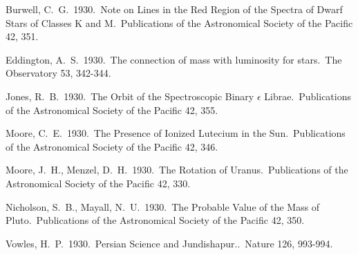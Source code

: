 \documentclass{lowell-prop}
\begin{document}


\begin{thebibliography}{99}
 Burwell, C.~G.\ 1930.\ Note on 
Lines in the Red Region of the Spectra of Dwarf Stars of Classes K and M.\ 
Publications of the Astronomical Society of the Pacific 42, 351. 

 Eddington, A.~S.\ 1930.\ The 
connection of mass with luminosity for stars.\ The Observatory 53, 342-344. 

 Jones, R.~B.\ 1930.\ The Orbit 
of the Spectroscopic Binary {$\epsilon$} Librae.\ Publications of the 
Astronomical Society of the Pacific 42, 355. 

 Moore, C.~E.\ 1930.\ The 
Presence of Ionized Lutecium in the Sun.\ Publications of the Astronomical 
Society of the Pacific 42, 346. 

 Moore, J.~H., Menzel, 
D.~H.\ 1930.\ The Rotation of Uranus.\ Publications of the Astronomical 
Society of the Pacific 42, 330. 

 Nicholson, S.~B., 
Mayall, N.~U.\ 1930.\ The Probable Value of the Mass of Pluto.\ 
Publications of the Astronomical Society of the Pacific 42, 350. 

\bibitem{1930Natur.126..993V} Vowles, H.~P.\ 1930.\ Persian 
Science and Jundishapur..\ Nature 126, 993-994. 

\end{thebibliography}

%
%
% 

\end{document}
